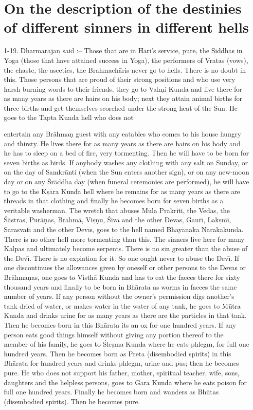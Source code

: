 \chapter{On the description of the destinies of different sinners in different hells}

1-19. Dharmar\=ajan said :-- Those that are in Hari's service, pure, the Siddhas in Yoga (those that have attained success in Yoga), the performers of Vratas (vows), the chaste, the ascetics, the Brahmach\=aris never go to hells. There is no doubt in this. Those persons that are proud of their strong positions and who use very harsh burning words to their friends, they go to Vah\d{n}i Kunda and live there for as many years as there are hairs on his body; next they attain animal births for three births and get themselves scorched under the strong heat of the Sun. He goes to the Tapta Kunda hell who does not

entertain any Br\=ahma\d{n} guest with any eatables who comes to his house hungry and thirsty. He lives there for as many years as there are hairs on his body and he has to sleep on a bed of fire, very tormenting. Then he will have to be born for seven births as birds. If anybody washes any clothing with any salt on Sunday, or on the day of Samkr\=anti (when the Sun enters another sign), or on any new-moon day or on any \'Sr\=addha day (when funeral ceremonies are performed), he will have to go to the K\d{s}\=ara Kunda hell where he remains for as many years as there are threads in that clothing and finally he becomes born for seven births as a veritable washerman. The wretch that abuses M\=ula Prakriti, the Vedas, the \'S\=astras, Pur\=a\d{n}as, Brahm\=a, Vi\d{s}\d{n}u, \'Siva and the other Devas, Gaur\={\i}, Lak\d{s}m\={\i}, Sarasvat\={\i} and the other Dev\={\i}s, goes to the hell named Bhay\=anaka Narakakunda. There is no other hell more tormenting than this. The sinners live here for many Kalpas and ultimately become serpents. There is no sin greater than the abuse of the Dev\={\i}. There is no expiation for it. So one ought never to abuse the Dev\={\i}. If one discontinues the allowances given by oneself or other persons to the Devas or Br\=ahma\d{n}as, one goes to Visth\=a Kunda and has to eat the faeces there for sixty thousand years and finally to be born in Bh\=arata as worms in faeces the same number of years. If any person without the owner's permission digs another's tank dried of water, or makes water in the water of any tank, he goes to M\=utra Kunda and drinks urine for as many years as there are the particles in that tank. Then he becomes born in this Bh\=arata its an ox for one hundred years. If any person eats good things himself without giving any portion thereof to the member of his family, he goes to \'Sle\d{s}ma Kunda where he eats phlegm, for full one hundred years. Then he becomes born as Preta (disembodied spirits) in this Bh\=arata for hundred years and drinks phlegm, urine and pus; then he becomes pure. He who does not support his father, mother, spiritual teacher, wife, sons, daughters and the helpless persons, goes to Gara Kunda where he eats poison for full one hundred years. Finally he becomes born and wanders as Bh\=utas (disembodied spirits). Then he becomes pure.

